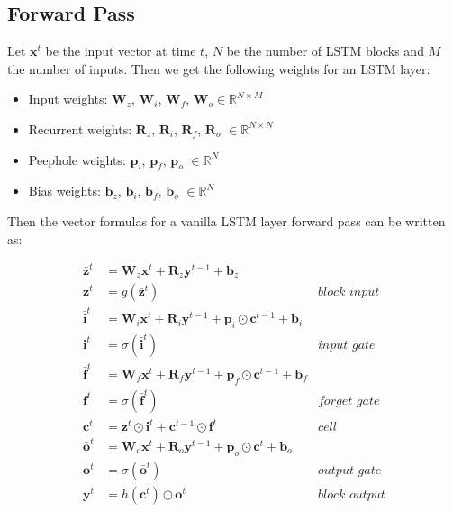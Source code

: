 \pagebreak

\subsection{Forward Pass}
\label{lstm_forward}
Let $\mathbf{x}^t$ be the input vector at time $t$, $N$ be the number of LSTM blocks and $M$ the number of inputs. Then we get the following weights for an LSTM layer:

\begin{itemize}

    \item Input weights: $\mathbf{W}_z$, $\mathbf{W}_i$, $\mathbf{W}_f$, $\mathbf{W}_o \in \mathbb{R}^{N \times M}$
    \item Recurrent weights: $\mathbf{R}_z$, $\mathbf{R}_i$, $\mathbf{R}_f$, $\mathbf{R}_o$ $\in \mathbb{R}^{N \times N}$
    \item Peephole weights: $\mathbf{p}_i$, $\mathbf{p}_f$, $\mathbf{p}_o$ $\in \mathbb{R}^{N}$
    \item Bias weights: $\mathbf{b}_z$, $\mathbf{b}_i$, $\mathbf{b}_f$, $\mathbf{b}_o$ $\in \mathbb{R}^{N}$
\end{itemize}

Then the vector formulas for a vanilla LSTM layer forward pass can be written as:

\begin{align*}
  \bar{\mathbf{z}}^t &= \mathbf{W}_z \mathbf{x}^t  + \mathbf{R}_z \mathbf{y}^{t-1}  + \mathbf{b}_z\\
    \mathbf{z}^t &= g(\bar{\mathbf{z}}^t) & \textit{block input}\\
    \bar{\mathbf{i}}^t &= \mathbf{W}_i \mathbf{x}^t + \mathbf{R}_i \mathbf{y}^{t-1}  + \mathbf{p}_i \odot \mathbf{c}^{t-1} + \mathbf{b}_i\\
    \mathbf{i}^t &= \sigma(\bar{\mathbf{i}}^t) & \textit{input gate}\\
    \bar{\mathbf{f}}^t &= \mathbf{W}_f \mathbf{x}^t + \mathbf{R}_f \mathbf{y}^{t-1}  + \mathbf{p}_f \odot \mathbf{c}^{t-1} + \mathbf{b}_f\\
    \mathbf{f}^t &= \sigma(\bar{\mathbf{f}}^t) & \textit{forget gate}\\
     \mathbf{c}^t &= \mathbf{z}^t \odot \mathbf{i}^t + \mathbf{c}^{t-1} \odot \mathbf{f}^t  & \textit{cell}\\
    \bar{\mathbf{o}}^t &= \mathbf{W}_o \mathbf{x}^t + \mathbf{R}_o \mathbf{y}^{t-1}  + \mathbf{p}_o \odot \mathbf{c}^{t} + \mathbf{b}_o\\
    \mathbf{o}^t &= \sigma(\bar{\mathbf{o}}^t) & \textit{output gate}\\
     \mathbf{y}^t &= h(\mathbf{c}^t) \odot \mathbf{o}^t & \textit{block output}
\end{align*}

